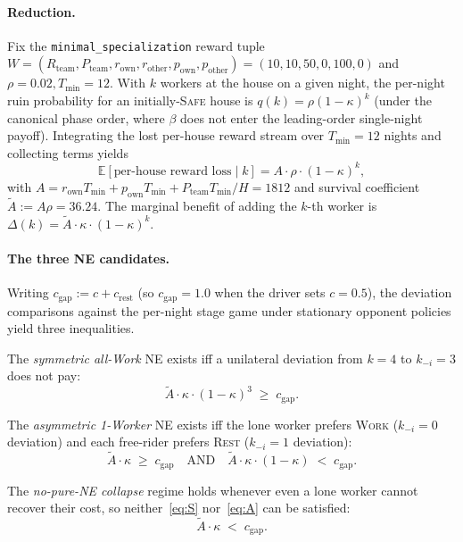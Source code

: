 \documentclass{anvil-paper}
\begin{document}
\paragraph{Reduction.}
Fix the \texttt{minimal\_specialization} reward tuple
$W{=}(R_{\text{team}},P_{\text{team}},r_{\text{own}},r_{\text{other}},
p_{\text{own}},p_{\text{other}}){=}(10,10,50,0,100,0)$ and $\rho{=}0.02,
T_{\min}{=}12$. With $k$ workers at the house on a given night, the per-night
ruin probability for an initially-\textsc{Safe} house is
$q(k){=}\rho(1-\kappa)^k$ (under the canonical phase order, where $\beta$
does not enter the leading-order single-night payoff). Integrating the lost
per-house reward stream over $T_{\min}{=}12$ nights and collecting terms
yields
\[
  \mathbb{E}[\text{per-house reward loss}\mid k] = A\cdot\rho\cdot(1-\kappa)^k,
\]
with $A{=}r_{\text{own}}T_{\min}+p_{\text{own}}T_{\min}+P_{\text{team}}
T_{\min}/H{=}1812$ and survival coefficient
$\tilde A{:=}A\rho{=}36.24$. The marginal benefit of adding the $k$-th
worker is $\Delta(k){=}\tilde A\cdot\kappa\cdot(1-\kappa)^k$.

\paragraph{The three NE candidates.}
Writing $c_{\text{gap}}{:=}c+c_{\text{rest}}$ (so $c_{\text{gap}}{=}1.0$ when
the driver sets $c{=}0.5$), the deviation comparisons against the per-night
stage game under stationary opponent policies yield three inequalities.

The \emph{symmetric all-Work} NE exists iff a unilateral deviation from
$k{=}4$ to $k_{-i}{=}3$ does not pay:
\begin{equation}
  \tilde A\cdot\kappa\cdot(1-\kappa)^{3}\;\geq\;c_{\text{gap}}.
  \tag{S}\label{eq:S}
\end{equation}

The \emph{asymmetric 1-Worker} NE exists iff the lone worker prefers
\textsc{Work} ($k_{-i}{=}0$ deviation) and each free-rider prefers
\textsc{Rest} ($k_{-i}{=}1$ deviation):
\begin{equation}
  \tilde A\cdot\kappa\;\geq\;c_{\text{gap}}
  \quad\text{AND}\quad
  \tilde A\cdot\kappa\cdot(1-\kappa)\;<\;c_{\text{gap}}.
  \tag{A}\label{eq:A}
\end{equation}

The \emph{no-pure-NE collapse} regime holds whenever even a lone worker
cannot recover their cost, so neither~\eqref{eq:S} nor~\eqref{eq:A} can be
satisfied:
\begin{equation}
  \tilde A\cdot\kappa\;<\;c_{\text{gap}}.
  \tag{C}\label{eq:C}
\end{equation}
\end{document}
